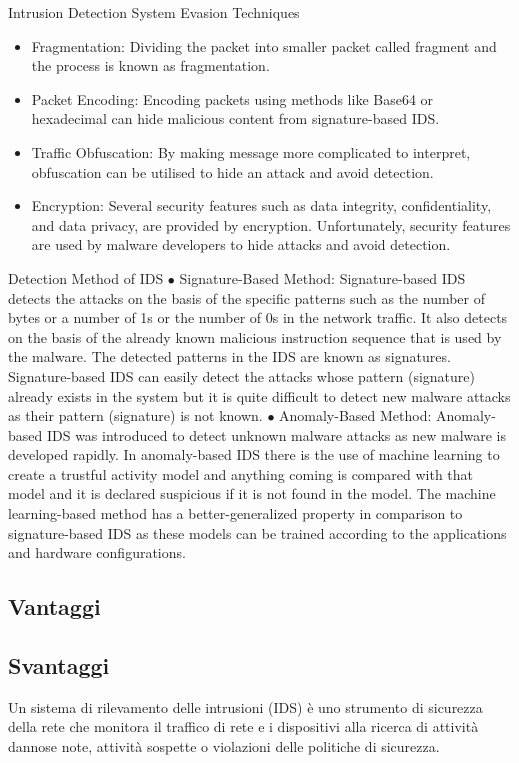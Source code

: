 Intrusion Detection System Evasion Techniques
\begin{itemize}
    \item Fragmentation: Dividing the packet into smaller packet called fragment and the process is known as fragmentation.
    \item Packet Encoding: Encoding packets using methods like Base64 or hexadecimal can hide malicious content from signature-based IDS.
    \item Traffic Obfuscation: By making message more complicated to interpret, obfuscation can be utilised to hide an attack and avoid detection.
    \item Encryption: Several security features such as data integrity, confidentiality, and data privacy, are provided by encryption. Unfortunately, security features are used by malware developers to hide attacks and avoid detection.
\end{itemize}

Detection Method of IDS
$\bullet$
Signature-Based Method: Signature-based IDS detects the attacks on the basis of the specific patterns such as the number of bytes or 
a number of 1s or the number of 0s in the network traffic. 
It also detects on the basis of the already known malicious instruction sequence that is used by the malware. 
The detected patterns in the IDS are known as signatures. 
Signature-based IDS can easily detect the attacks whose pattern (signature) already exists in the system but it is 
quite difficult to detect new malware attacks as their pattern (signature) is not known.
$\bullet$
Anomaly-Based Method: Anomaly-based IDS was introduced to detect unknown malware attacks as new malware is developed rapidly. 
In anomaly-based IDS there is the use of machine learning to create a trustful activity model and anything coming is compared 
with that model and it is declared suspicious if it is not found in the model. 
The machine learning-based method has a better-generalized property in comparison to signature-based IDS as these models 
can be trained according to the applications and hardware configurations.


\subsection{Vantaggi}
\subsection{Svantaggi}


Un sistema di rilevamento delle intrusioni (IDS) è uno strumento di sicurezza della rete che monitora il traffico di 
rete e i dispositivi alla ricerca di attività dannose note, attività sospette o violazioni delle politiche di sicurezza.

